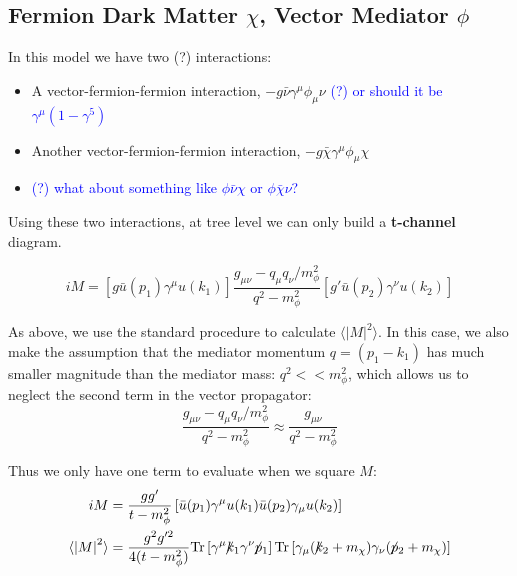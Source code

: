 \documentclass[11pt, oneside]{article}   	%
\newcommand{\fsl}[1]{\ensuremath{\mathrlap{\!\not{\phantom{#1}}}#1}}%
\begin{document}
\newpage
\subsection{\normalsize Fermion Dark Matter $\chi$, Vector Mediator $\phi$ } 

In this model we have two (?) interactions: 
\begin{itemize}
    \item A vector-fermion-fermion interaction, $-g\bar{\nu} \gamma^\mu \phi_\mu \nu$ \textcolor{blue}{(?) or should it be $\gamma^\mu (1 - \gamma^5)$}
    \item Another vector-fermion-fermion interaction, $-g \bar{\chi} \gamma^\mu \phi_\mu \chi$
    \item \textcolor{blue}{(?) what about something like $\phi \bar{\nu} \chi$ or $\phi \bar{\chi} \nu$?} 
\end{itemize}

Using these two interactions, at tree level we can only build a \textbf{t-channel} diagram.

\[ iM = \left[ g \bar{u}(p_1) \gamma^\mu u(k_1) \right] \frac{g_{\mu\nu} - q_\mu q_\nu / m_\phi^2}{q^2 - m_\phi^2} \left[ g' \bar{u}(p_2) \gamma^\nu u(k_2) \right] \]

As above, we use the standard procedure to calculate $\langle \left| M \right|^2 \rangle$. 
In this case, we also make the assumption that the mediator momentum $q = (p_1 - k_1)$ has much smaller magnitude than the mediator mass: $q^2 << m_\phi^2$, which allows us to neglect the second term in the vector propagator: \[ \frac{g_{\mu\nu} - q_\mu q_\nu / m_\phi^2}{q^2 - m_\phi^2} \approx \frac{g_{\mu\nu}}{q^2 - m_\phi^2} \]

Thus we only have one term to evaluate when we square $M$: 
\begin{align*}
iM & = \frac{gg'}{t-m_\phi^2} \left[ \bar{u}(p_1)\gamma^\mu u(k_1) \bar{u}(p_2) \gamma_\mu u(k_2) \right] \\
\langle \left| M \right|^2 \rangle & = \frac{g^2g'^2}{4(t-m_\phi^2)} \text{Tr} \left[ \gamma^\mu \fsl{k_1} \gamma^\nu \fsl{p_1} \right] \text{Tr} \left[ \gamma_\mu (\fsl{k_2} + m_\chi) \gamma_\nu (\fsl{p_2} + m_\chi) \right] 
\end{align*}
\end{document}

